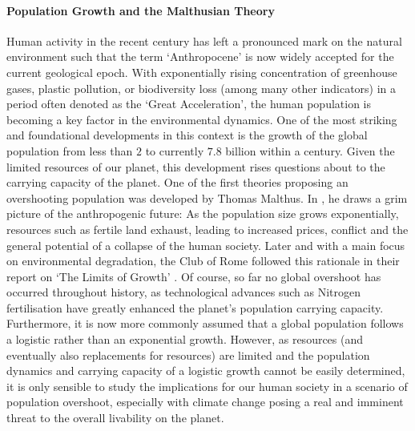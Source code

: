 \paragraph{Population Growth and the Malthusian Theory}
Human activity in the recent century has left a pronounced mark on the natural environment such that the term `Anthropocene' is now widely accepted for the current geological epoch.
With exponentially rising concentration of greenhouse gases, plastic pollution, or biodiversity loss (among many other indicators) in a period often denoted as the `Great Acceleration', the human population is becoming a key factor in the environmental dynamics.
One of the most striking and foundational developments in this context is the growth of the global population from less than $2$ to currently $7.8$ billion within a century. 
Given the limited resources of our planet, this development rises questions about to the carrying capacity of the planet. %
One of the first theories proposing an overshooting population was developed by Thomas Malthus.
In \citet{Malthus1798}, he draws a grim picture of the anthropogenic future: As the population size grows exponentially, resources such as fertile land exhaust,
leading to increased prices, conflict and the general potential of a collapse of the human society.
Later and with a main focus on environmental degradation, the Club of Rome followed this rationale in their report on `The Limits of Growth' \citep{clubofrome1972}.
Of course, so far no global overshoot has occurred throughout history, as technological advances such as Nitrogen fertilisation have greatly enhanced the planet's population carrying capacity.
Furthermore, it is now more commonly assumed that a global population follows a logistic rather than an exponential growth. 
However, as resources (and eventually also replacements for resources) are limited and the population dynamics and carrying capacity of a logistic growth cannot be easily determined, it is only sensible to study the implications for our human society in a scenario of population overshoot, especially with climate change posing a real and imminent threat to the overall livability on the planet.



